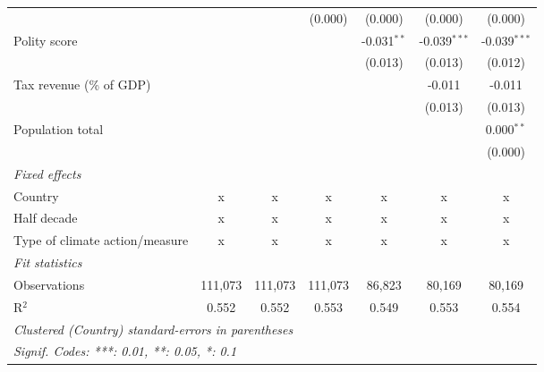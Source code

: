 \begin{tabular}{lcccccc}
                                                                           &               &                & (0.000)        & (0.000)        & (0.000)        & (0.000)\\   
   Polity score                                                            &               &                &                & -0.031$^{**}$  & -0.039$^{***}$ & -0.039$^{***}$\\   
                                                                           &               &                &                & (0.013)        & (0.013)        & (0.012)\\   
   Tax revenue (\% of GDP)                                                 &               &                &                &                & -0.011         & -0.011\\   
                                                                           &               &                &                &                & (0.013)        & (0.013)\\   
   Population total                                                        &               &                &                &                &                & 0.000$^{**}$\\   
                                                                           &               &                &                &                &                & (0.000)\\   
   \emph{Fixed effects}\\
   Country                                                                 & x             & x              & x              & x              & x              & x\\  
   Half decade                                                             & x             & x              & x              & x              & x              & x\\  
   Type of climate action/measure                                          & x             & x              & x              & x              & x              & x\\  
   \midrule \emph{Fit statistics}\\
   Observations                                                            & 111,073       & 111,073        & 111,073        & 86,823         & 80,169         & 80,169\\  
   R$^2$                                                                   & 0.552         & 0.552          & 0.553          & 0.549          & 0.553          & 0.554\\  
   \midrule
   \multicolumn{7}{l}{\emph{Clustered (Country) standard-errors in parentheses}}\\
   \multicolumn{7}{l}{\emph{Signif. Codes: ***: 0.01, **: 0.05, *: 0.1}}\\
\end{tabular}
\par\endgroup


